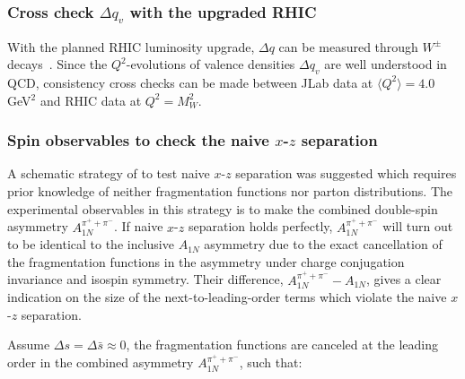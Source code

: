 \subsubsection{ Cross check $\Delta q_v$ with the upgraded RHIC}

With the planned RHIC luminosity upgrade,  $\Delta q$ can be measured through 
$W^\pm$ decays~\cite{bunce00}.  Since the $Q^2$-evolutions of valence densities  $\Delta q_v$ 
are well understood in QCD, consistency cross checks can be made between JLab data at $\langle Q^2 \rangle=4.0$ GeV$^2$
and RHIC data at $Q^2 = M_W^2$.   

\subsubsection{Spin observables to check the \lo naive $x$-$z$ separation}

A schematic strategy of to test \lo naive $x$-$z$ separation
was suggested \cite{leader2} which requires prior knowledge of neither fragmentation functions nor
parton distributions. The experimental observables in this strategy
is to make the combined double-spin asymmetry $A_{1N}^{\pi^+ + \pi^-}$. 
If \lo naive $x$-$z$ separation holds perfectly, 
$A_{1N}^{\pi^+ + \pi^-}$ will turn out to be identical to the inclusive 
$A_{1N}$ asymmetry due to the exact
 cancellation of the fragmentation functions in the asymmetry 
under charge conjugation invariance and isospin symmetry.
Their difference, $A_{1N}^{\pi^+ + \pi^-}-A_{1N}$, gives a clear indication 
on the size of the next-to-leading-order terms which violate the naive \lo 
$x$-$z$ separation.

Assume $\Delta s = \Delta \bar{s} \approx 0$, 
 the fragmentation functions are canceled at the leading order in 
 the combined asymmetry $A_{1N}^{\pi^+ + \pi^-}$, such that: 

